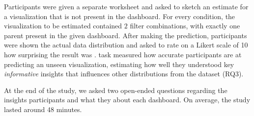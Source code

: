 Participants were given a separate worksheet 
and asked to sketch an estimate for a visualization 
that is not present in the dashboard. 
For every condition, the visualization to be estimated 
contained $2$ filter combinations, 
with exactly one parent present in the given dashboard. 
After making the prediction, 
participants were shown the actual data 
distribution and asked to rate on a Likert scale 
of 10 how surprising the result was 
. 
 task measured how accurate participants 
are at predicting an unseen visualization, 
estimating how well they understood key \emph{informative} insights that influences other distributions from the dataset (RQ3).

\smallskip
\noindent At the end of the study, we asked two open-ended questions regarding the insights 
 participants 
and what they 
about each dashboard. On average, the study lasted around 48 minutes.

